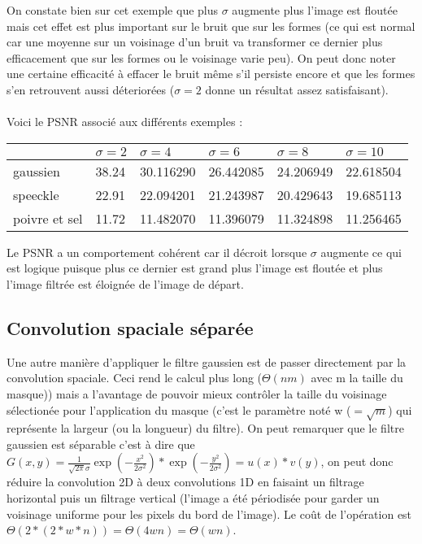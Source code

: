 \documentclass[12pt]{article}
\numberwithin{equation}{section}
\begin{document}
On constate bien sur cet exemple que plus $\sigma$ augmente plus l'image est floutée mais cet effet est plus important sur le bruit que sur les formes (ce qui est normal car une moyenne sur un voisinage d'un bruit va transformer ce dernier plus efficacement que sur les formes ou le voisinage varie peu). On peut donc noter une certaine efficacité à effacer le bruit même s'il persiste encore et que les formes s'en retrouvent aussi déteriorées ($\sigma = 2$ donne un résultat assez satisfaisant).
\\\\
Voici le PSNR associé aux différents exemples :\\
\begin{center}
  \begin{tabular}{|l|l|l|l|l|l|}
    \hline
    & $\sigma = 2$ & $\sigma = 4$ & $\sigma = 6$  & $\sigma = 8$ & $\sigma = 10$ \\
    \hline
    gaussien & 38.24 & 30.116290 & 26.442085 & 24.206949 & 22.618504\\
    \hline
    speeckle & 22.91 & 22.094201  & 21.243987 & 20.429643 & 19.685113\\
    \hline
    poivre et sel & 11.72 & 11.482070 & 11.396079 & 11.324898 & 11.256465\\
    \hline
  \end{tabular}
\end{center}
Le PSNR a un comportement cohérent car il décroit lorsque $\sigma$ augmente ce qui est logique puisque plus ce dernier est grand plus l'image est floutée et plus l'image filtrée est éloignée de l'image de départ.
\subsection{Convolution spaciale séparée}
Une autre manière d'appliquer le filtre gaussien est de passer directement par la convolution spaciale. Ceci rend le calcul plus long ($\Theta(nm)$ avec m la taille du masque)) mais a l'avantage de pouvoir mieux contrôler la taille du voisinage sélectionée pour l'application du masque (c'est le paramètre noté w ($=\sqrt{m}$) qui représente la largeur (ou la longueur) du filtre). On peut remarquer que le filtre gaussien est séparable c'est à dire que $ G(x,y) = \frac{1}{\sqrt{2\pi }\sigma}\exp({-\frac{x^2}{2\sigma^2}})*\exp({-\frac{y^2}{2\sigma^2}}) = u(x)*v(y)$, on peut donc réduire la convolution 2D à deux convolutions 1D en faisaint un filtrage horizontal puis un filtrage vertical (l'image a été périodisée pour garder un voisinage uniforme pour les pixels du bord de l'image). Le coût de l'opération est $\Theta(2*(2*w*n)) = \Theta(4wn) = \Theta(wn)$. \\
\end{document}
